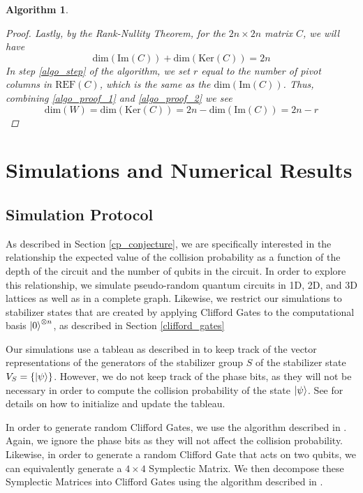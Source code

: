 \documentclass[11pt]{article}
\newtheorem{algorithm}{Algorithm}
\theoremstyle{definition}
\theoremstyle{plain}
\begin{document}
\begin{algorithm}
\begin{proof}
Lastly, by the Rank-Nullity Theorem, for the $2n \times 2n$ matrix $C$, we will have
\begin{equation}\label{algo_proof_2}
\text{dim}({\text{Im}(C)}) + \text{dim}(\text{Ker}(C)) = 2n
\end{equation}
In step {\ref{algo_step}} of the algorithm, we set $r$ equal to the number of pivot columns in $\text{REF}(C)$, which is the same as the $\text{dim}(\text{Im}(C))$. Thus, combining {\ref{algo_proof_1}} and {\ref{algo_proof_2}} we see 
\begin{equation}
  \text{dim}(W) = \text{dim}(\text{Ker}(C)) = 2n - \text{dim}({\text{Im}(C)})
  = 2n - r
\end{equation}
\end{proof}
\end{algorithm}


\section{Simulations and Numerical Results}

\subsection{Simulation Protocol}
As described in Section {\ref{cp_conjecture}}, we are specifically interested in the relationship the expected value of the collision probability as a function of the depth of the circuit and the number of qubits in the circuit. In order to explore this relationship, we simulate pseudo-random quantum circuits in 1D, 2D, and 3D lattices as well as in a complete graph. Likewise, we restrict our simulations to stabilizer states that are created by applying Clifford Gates to the computational basis $\ket{0}^{\otimes n}$, as described in Section {\ref{clifford_gates}}

Our simulations use a tableau as described in {\cite{aaronson}} to keep track of the vector representations of the generators of the stabilizer group $S$ of the stabilizer state $V_S = \{ \ket{\psi} \}$. However, we do not keep track of the phase bits, as they will not be necessary in order to compute the collision probability of the state $\ket{\psi}$. See {\cite{aaronson}} for details on how to initialize and update the tableau. 

In order to generate random Clifford Gates, we use the algorithm described in {\cite{random_clifford}}. Again, we ignore the phase bits as they will not affect the collision probability. Likewise, in order to generate a random Clifford Gate that acts on two qubits, we can equivalently generate a $4 \times 4$ Symplectic Matrix. We then decompose these Symplectic Matrices into Clifford Gates using the algorithm described in {\cite{aaronson}}.
\end{document}
